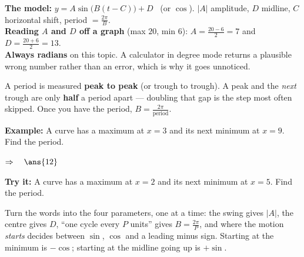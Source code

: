 \documentclass[12pt]{article}
\begin{document}

\begin{formulabox}
\textbf{The model:} $y = A\sin\big(B(t - C)\big) + D$ \ (or $\cos$).\quad
$|A|$ amplitude, $D$ midline, $C$ horizontal shift,
period $= \frac{2\pi}{B}$.\\[3pt]
\textbf{Reading $A$ and $D$ off a graph} (max $20$, min $6$):
$A = \frac{20 - 6}{2} = 7$ \quad and \quad $D = \frac{20 + 6}{2} = 13$.\\[3pt]
\textbf{Always radians} on this topic. A calculator in degree mode returns a
plausible wrong number rather than an error, which is why it goes unnoticed.
\end{formulabox}


\begin{formulabox}
A period is measured \textbf{peak to peak} (or trough to trough). A peak and
the \emph{next} trough are only \textbf{half} a period apart --- doubling that
gap is the step most often skipped. Once you have the period,
$B = \frac{2\pi}{\text{period}}$.
\end{formulabox}

\begin{examplebox}
\textbf{Example:} \quad A curve has a maximum at $x = 3$ and its next minimum
at $x = 9$. Find the period.

$\Rightarrow\quad \ans{12}$
\end{examplebox}

\begin{tryitbox}
\textbf{Try it:} \quad A curve has a maximum at $x = 2$ and its next minimum at
$x = 5$. Find the period.\\[2pt]
\end{tryitbox}


\begin{formulabox}
Turn the words into the four parameters, one at a time: the swing gives $|A|$,
the centre gives $D$, ``one cycle every $P$ units'' gives
$B = \frac{2\pi}{P}$, and where the motion \emph{starts} decides between
$\sin$, $\cos$ and a leading minus sign. Starting at the minimum is
$-\cos$; starting at the midline going up is $+\sin$.
\end{formulabox}
\end{document}
